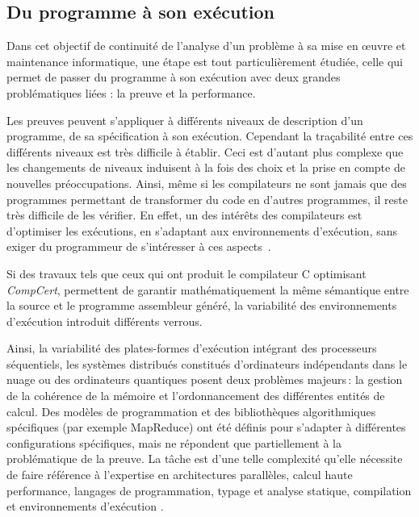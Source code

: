 \documentclass[11pt]{article}
\newcommand{\defi}[1]{\cite[défi]{#1}}
\begin{document}

\subsection{Du programme à son exécution\label{ss:fiabilite:execution}}
Dans cet objectif de continuité de l'analyse d'un problème à sa mise en {\oe}uvre et maintenance informatique, une étape est tout particulièrement étudiée, celle qui permet de passer du programme à son exécution avec deux  grandes problématiques liées : la preuve et la performance.

Les preuves peuvent s'appliquer à différents niveaux de description d'un programme, de sa spécification à son exécution. 
Cependant la traçabilité entre ces différents niveaux est très difficile à établir. Ceci est d'autant plus complexe que les changements de niveaux induisent à la fois des choix et la prise en compte de nouvelles préoccupations.
Ainsi, même si les compilateurs ne sont jamais que des programmes permettant de transformer du code en d'autres programmes, il reste très difficile de les vérifier. En effet, un des intérêts des compilateurs est d'optimiser les exécutions, en s'adaptant aux environnements d'exécution, sans exiger du programmeur de s'intéresser à ces aspects~\defi{Monniaux}.

Si des travaux tels que ceux qui ont produit le compilateur C optimisant \textit{CompCert}, permettent de garantir mathématiquement la même sémantique entre la source et le programme assembleur généré, la variabilité des environnements d'exécution introduit différents verrous. 

Ainsi, la variabilité des  plates-formes d'exécution intégrant des processeurs séquentiels, les systèmes distribués constitués d'ordinateurs indépendants dans le nuage ou des ordinateurs quantiques posent  deux problèmes majeurs\,: la gestion de la cohérence de la mémoire et l'ordonnancement des différentes entités de calcul. Des modèles de programmation et des bibliothèques algorithmiques spécifiques (par exemple MapReduce) ont été définis pour s'adapter à différentes configurations spécifiques, mais ne répondent que partiellement à la problématique de la preuve. La tâche est d'une telle complexité qu'elle nécessite de faire référence à l'expertise en architectures parallèles,  calcul haute performance, langages de programmation,  typage et  analyse statique,  compilation et  environnements d'exécution \defi{compilation}.
\end{document}
